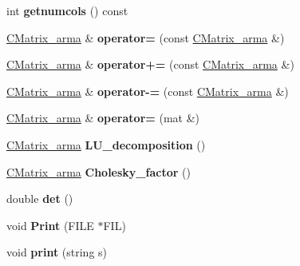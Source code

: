 \begin{DoxyCompactItemize}
int {\bfseries getnumcols} () const
\item 
\mbox{\label{class_c_matrix__arma_a2b01bc8d502fa0bffd732d084a6b05f5}} 
\hyperlink{class_c_matrix__arma}{C\+Matrix\+\_\+arma} \& {\bfseries operator=} (const \hyperlink{class_c_matrix__arma}{C\+Matrix\+\_\+arma} \&)
\item 
\mbox{\label{class_c_matrix__arma_a7b19b04b4d946e45374e80963901bc26}} 
\hyperlink{class_c_matrix__arma}{C\+Matrix\+\_\+arma} \& {\bfseries operator+=} (const \hyperlink{class_c_matrix__arma}{C\+Matrix\+\_\+arma} \&)
\item 
\mbox{\label{class_c_matrix__arma_a016a98e1c18473926a2f8c13b83ecbd9}} 
\hyperlink{class_c_matrix__arma}{C\+Matrix\+\_\+arma} \& {\bfseries operator-\/=} (const \hyperlink{class_c_matrix__arma}{C\+Matrix\+\_\+arma} \&)
\item 
\mbox{\label{class_c_matrix__arma_a5b488bc546655e876d2d8233e25bfae1}} 
\hyperlink{class_c_matrix__arma}{C\+Matrix\+\_\+arma} \& {\bfseries operator=} (mat \&)
\item 
\mbox{\label{class_c_matrix__arma_a7257802d79fbe944640cdf186592077d}} 
\hyperlink{class_c_matrix__arma}{C\+Matrix\+\_\+arma} {\bfseries L\+U\+\_\+decomposition} ()
\item 
\mbox{\label{class_c_matrix__arma_a066f6a9b612aad93752683dd19746f45}} 
\hyperlink{class_c_matrix__arma}{C\+Matrix\+\_\+arma} {\bfseries Cholesky\+\_\+factor} ()
\item 
\mbox{\label{class_c_matrix__arma_a095bc590ca312d603df46c35bb4aa50e}} 
double {\bfseries det} ()
\item 
\mbox{\label{class_c_matrix__arma_adbd5cfde91608a63910f8c44dd334d3d}} 
void {\bfseries Print} (F\+I\+LE $\ast$F\+IL)
\item 
\mbox{\label{class_c_matrix__arma_a15d4b41dc5249e7c92a6353132e345aa}} 
void {\bfseries print} (string s)
\item 
\mbox{\label{class_c_matrix__arma_ac6ac6bc989dbc42b914582cd27556ef5}} 

\end{DoxyCompactItemize}

